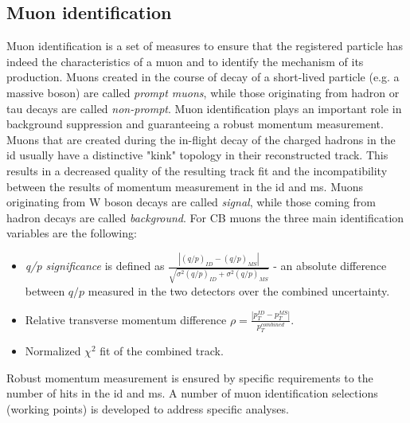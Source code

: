      \subsection{Muon identification}
     Muon identification is a set of measures to ensure that the registered particle has indeed the characteristics of a muon and to identify the mechanism of its production. Muons created in the course of decay of a short-lived particle (e.g. a massive boson) are called \textit{prompt muons}, while those originating from hadron or tau decays are called \textit{non-prompt}. Muon identification plays an important role in background suppression and guaranteeing a robust momentum measurement.\\
     Muons that are created during the in-flight decay of the charged hadrons in the \gls{id} usually have a distinctive "kink" topology in their reconstructed track. This results in a decreased quality of the resulting track fit and the incompatibility between the results of momentum measurement in the \gls{id} and \gls{ms}. Muons originating from W boson decays are called \textit{signal}, while those coming from hadron decays are called \textit{background}. For CB muons the three main identification variables are the following:
     \begin{itemize}
    	\item \textit{q/p significance} is defined as $\frac{|(q/p)_{ID}-(q/p)_{MS}|}{\sqrt{\sigma^2(q/p)_{ID}+\sigma^2(q/p)_{MS}}}$ - an absolute difference between $q/p$ measured in the two detectors over the combined uncertainty.
    	\item Relative transverse momentum difference $\rho = \frac{|p_T^{ID}-p_T^{MS}|}{p_T^{combined}}$.
    	\item Normalized $\chi^2$ fit of the combined track.
 	\end{itemize}
 	Robust momentum measurement is ensured by specific requirements to the number of hits in the \gls{id} and \gls{ms}. A number of muon identification selections (working points) is developed to address specific analyses. 
